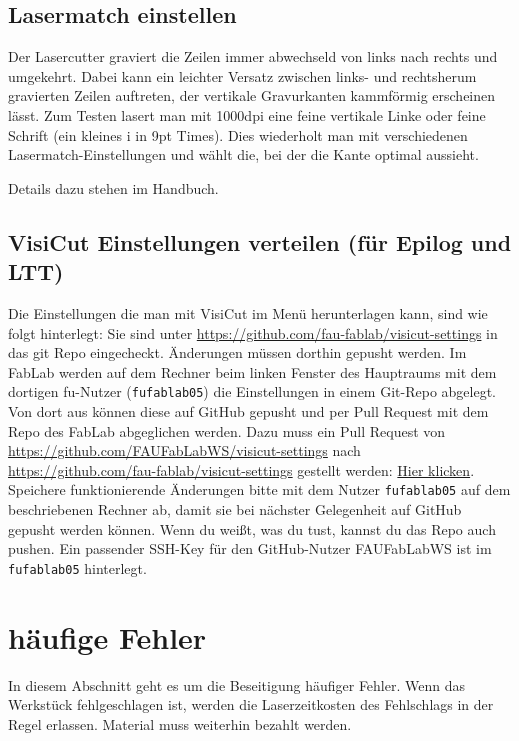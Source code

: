 \documentclass{\basedir/fablab-document}
\begin{document}
	\subsection{Lasermatch einstellen}
	Der Lasercutter graviert die Zeilen immer abwechseld von links nach rechts und umgekehrt. Dabei kann ein leichter Versatz zwischen links- und rechtsherum gravierten Zeilen auftreten, der vertikale Gravurkanten kammförmig erscheinen lässt. Zum Testen lasert man mit 1000dpi eine feine vertikale Linke oder feine Schrift (ein kleines i in 9pt Times). Dies wiederholt man mit verschiedenen Lasermatch-Einstellungen und wählt die, bei der die Kante optimal aussieht.

	Details dazu stehen im Handbuch.

	\subsection{VisiCut Einstellungen verteilen (für Epilog und LTT)}
	\label{sec:wartung-epilog:visicut}
	Die Einstellungen die man mit VisiCut im Menü herunterlagen kann, sind wie folgt hinterlegt:
	Sie sind unter \url{https://github.com/fau-fablab/visicut-settings} in das git Repo eingecheckt. Änderungen müssen dorthin gepusht werden. Im FabLab werden auf dem Rechner beim linken Fenster des Hauptraums mit dem dortigen fu-Nutzer (\texttt{fufablab05}) die Einstellungen in einem Git-Repo abgelegt. Von dort aus können diese auf GitHub gepusht und per Pull Request mit dem Repo des FabLab abgeglichen werden. Dazu muss ein Pull Request von \url{https://github.com/FAUFabLabWS/visicut-settings} nach \url{https://github.com/fau-fablab/visicut-settings} gestellt werden: \href{https://github.com/fau-fablab/visicut-settings/compare/master...FAUFabLabWS:master}{Hier klicken}. Speichere funktionierende Änderungen bitte mit dem Nutzer \texttt{fufablab05} auf dem beschriebenen Rechner ab, damit sie bei nächster Gelegenheit auf GitHub gepusht werden können. Wenn du weißt, was du tust, kannst du das Repo auch pushen. Ein passender SSH-Key für den GitHub-Nutzer FAUFabLabWS ist im \texttt{fufablab05} hinterlegt.

	\section{häufige Fehler}
	\label{sec:fehler-allgemein}
	In diesem Abschnitt geht es um die Beseitigung häufiger Fehler. Wenn das Werkstück fehlgeschlagen ist, werden die Laserzeitkosten des Fehlschlags in der Regel erlassen. Material muss weiterhin bezahlt werden.
\end{document}
